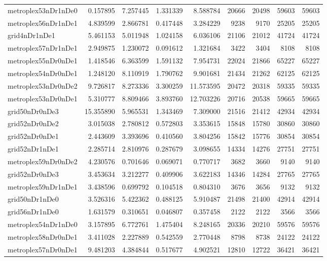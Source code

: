 \begin{longtable}{|l|r|r|r|r|r|r|r|r|}
metroplex53nDr1nDe0 & 0.157895 & 7.257445 & 1.331339 & 8.588784 & 20666 & 20498 & 59603 & 59603 \\
metroplex56nDr1nDe1 & 4.839599 & 2.866781 & 0.417448 & 3.284229 & 9238 & 9170 & 25205 & 25205 \\
grid4nDr1nDe1 & 5.461153 & 5.011948 & 1.024158 & 6.036106 & 21106 & 21012 & 41724 & 41724 \\
metroplex57nDr1nDe1 & 2.949875 & 1.230072 & 0.091612 & 1.321684 & 3422 & 3404 & 8108 & 8108 \\
metroplex55nDr0nDe1 & 1.418546 & 6.363599 & 1.591132 & 7.954731 & 22024 & 21866 & 65227 & 65227 \\
metroplex54nDr0nDe1 & 1.248120 & 8.110919 & 1.790762 & 9.901681 & 21434 & 21262 & 62125 & 62125 \\
metroplex53nDr0nDe2 & 9.726817 & 8.273336 & 3.300259 & 11.573595 & 20472 & 20318 & 59335 & 59335 \\
metroplex53nDr0nDe1 & 5.310777 & 8.809466 & 3.893760 & 12.703226 & 20716 & 20538 & 59665 & 59665 \\
grid50nDr0nDe3 & 15.355890 & 5.965531 & 1.343469 & 7.309000 & 21516 & 21412 & 42934 & 42934 \\
grid52nDr0nDe2 & 3.015038 & 2.780812 & 0.572803 & 3.353615 & 15848 & 15780 & 30860 & 30860 \\
grid52nDr0nDe1 & 2.443609 & 3.393696 & 0.410560 & 3.804256 & 15842 & 15776 & 30854 & 30854 \\
grid52nDr1nDe1 & 2.285714 & 2.810976 & 0.287679 & 3.098655 & 14334 & 14276 & 27751 & 27751 \\
metroplex59nDr0nDe2 & 4.230576 & 0.701646 & 0.069071 & 0.770717 & 3682 & 3660 & 9140 & 9140 \\
grid52nDr0nDe3 & 3.453634 & 3.212277 & 0.409906 & 3.622183 & 14346 & 14284 & 27765 & 27765 \\
metroplex59nDr1nDe1 & 3.438596 & 0.699792 & 0.104518 & 0.804310 & 3676 & 3656 & 9132 & 9132 \\
grid50nDr1nDe0 & 3.526316 & 5.422362 & 0.488125 & 5.910487 & 21498 & 21400 & 42914 & 42914 \\
grid56nDr1nDe0 & 1.631579 & 0.310651 & 0.046807 & 0.357458 & 2122 & 2122 & 3566 & 3566 \\
metroplex54nDr1nDe0 & 3.157895 & 6.772761 & 1.475404 & 8.248165 & 20336 & 20210 & 59576 & 59576 \\
metroplex58nDr0nDe1 & 3.411028 & 2.227889 & 0.542559 & 2.770448 & 8798 & 8738 & 24122 & 24122 \\
metroplex57nDr0nDe1 & 9.481203 & 4.384844 & 0.517677 & 4.902521 & 12810 & 12722 & 36421 & 36421 \\

\end{longtable}
